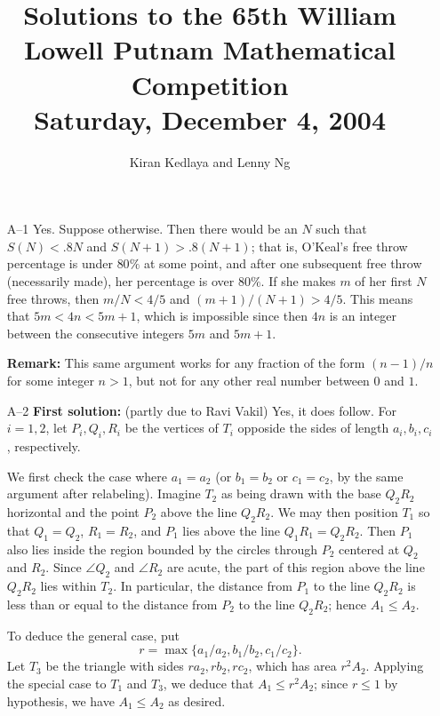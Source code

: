 \documentclass[amssymb,twocolumn,pra,10pt,aps]{revtex4-1}
\begin{document}
\title{Solutions to the 65th William Lowell Putnam Mathematical Competition \\
    Saturday, December 4, 2004}
\author{Kiran Kedlaya and Lenny Ng}
\noaffiliation
\maketitle

\begin{itemize}

\item[A--1]
Yes. Suppose otherwise. Then there would be an $N$ such that $S(N) < .8N$
and $S(N+1) > .8(N+1)$; that is, O'Keal's free throw percentage is under $80\%$
at some point, and after one subsequent free throw (necessarily made),
her percentage is over $80\%$. If she makes $m$ of her first $N$ free
throws, then $m/N < 4/5$ and $(m+1)/(N+1) > 4/5$. This means that $5m <
4n < 5m+1$, which is impossible since then $4n$ is an integer between the
consecutive integers $5m$ and $5m+1$.

\textbf{Remark:}
This same argument works for any fraction of the form
$(n-1)/n$ for some integer $n>1$, but not for any other real number
between $0$ and $1$.

\item[A--2]
\textbf{First solution:} (partly due to Ravi Vakil)
Yes, it does follow.
For $i=1,2$,
let $P_i, Q_i, R_i$ be the vertices of $T_i$ opposide the sides of length
$a_i, b_i, c_i$, respectively.

We first check the case where $a_1 = a_2$ (or $b_1 = b_2$ or $c_1 = c_2$,
by the same argument after relabeling).
Imagine $T_2$ as being drawn with the base $Q_2R_2$
horizontal and the point $P_2$ above the line $Q_2R_2$. We may then
position $T_1$ so that $Q_1 = Q_2$, $R_1 = R_2$, and $P_1$ lies above the line
$Q_1R_1 = Q_2R_2$. Then $P_1$ also lies inside the region bounded by the
circles through $P_2$ centered at $Q_2$ and $R_2$. Since $\angle Q_2$
and $\angle R_2$ are acute, the part of this region above the line
$Q_2R_2$ lies within $T_2$. In particular, the
distance from $P_1$ to the line $Q_2R_2$ is less than or equal to the
distance from $P_2$ to the line $Q_2R_2$; hence $A_1 \leq A_2$.

To deduce the general case, put
\[
r = \max\{a_1/a_2, b_1/b_2, c_1/c_2\}.
\]
Let $T_3$ be the triangle with sides $ra_2, rb_2, rc_2$, which
has area $r^2 A_2$. Applying the special case to $T_1$ and $T_3$,
we deduce that $A_1 \leq r^2 A_2$; since $r \leq 1$ by hypothesis,
we have $A_1 \leq A_2$ as desired.


\end{itemize}
\end{document}
